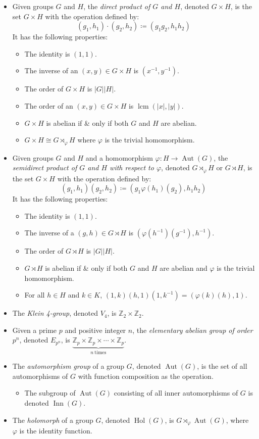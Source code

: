 \documentclass{article}
\newcommand{\Z}{\mathbb{Z}}
\DeclareMathOperator{\lcm}{lcm}
\DeclareMathOperator{\Aut}{Aut}
\newcommand{\opn}{\operatorname}
\begin{document}
\begin{itemize}
\item Given groups $G$ and $H$, the \emph{direct product of $G$ and $H$}, denoted $G\times H$, is the set $G\times H$ with the operation defined by: $$(g_1, h_1)\cdot(g_2, h_2)\coloneqq (g_1g_2, h_1h_2)$$  It has the following properties:
 \begin{itemize}
 \item The identity is $(1,1)$.
 \item The inverse of an $(x,y)\in G\times H$ is $(x^{-1}, y^{-1})$.
 \item The order of $G\times H$ is $|G| |H|$.
 \item The order of an $(x,y)\in G\times H$ is $\lcm(|x|, |y|)$.
 \item $G\times H$ is abelian if \& only if both $G$ and $H$ are abelian.
 \item $G\times H \cong G\rtimes_\varphi H$ where $\varphi$ is the trivial homomorphism.
 \end{itemize}

\item Given groups $G$ and $H$ and a homomorphism $\varphi\colon H\to\Aut(G)$, the \emph{semidirect product of $G$ and $H$ with respect to $\varphi$}, denoted $G\rtimes_\varphi H$ or $G\rtimes H$, is the set $G\times H$ with the operation defined by: $$(g_1, h_1)(g_2, h_2) \coloneqq (g_1\varphi(h_1)(g_2), h_1h_2)$$  It has the following properties:
 \begin{itemize}
 \item The identity is $(1,1)$.
 \item The inverse of a $(g,h)\in G\rtimes H$ is $(\varphi(h^{-1})(g^{-1}), h^{-1})$.
 \item The order of $G\rtimes H$ is $|G| |H|$.
 \item $G\rtimes H$ is abelian if \& only if both $G$ and $H$ are abelian and $\varphi$ is the trivial homomorphism.
 \item For all $h\in H$ and $k\in K$, $(1,k)(h,1)(1, k^{-1}) = (\varphi(k)(h), 1)$.
 \end{itemize}

\item The \emph{Klein 4-group}, denoted $V_4$, is $\Z_2\times\Z_2$.
\item Given a prime $p$ and positive integer $n$, the \emph{elementary abelian group of order $p^n$}, denoted $E_{p^n}$, is $\underbrace{\Z_p\times\Z_p\times\cdots\times\Z_p}_{n\ \mathrm{times}}$.
\item The \emph{automorphism group} of a group $G$, denoted $\Aut(G)$, is the set of all automorphisms of $G$ with function composition as the operation.
 \begin{itemize}
 \item The subgroup of $\Aut(G)$ consisting of all inner automorphisms of $G$ is denoted $\opn{Inn}(G)$.
 \end{itemize}
\item The \emph{holomorph} of a group $G$, denoted $\opn{Hol}(G)$, is $G\rtimes_\varphi\Aut(G)$, where $\varphi$ is the identity function.


\end{itemize}
\end{document}

